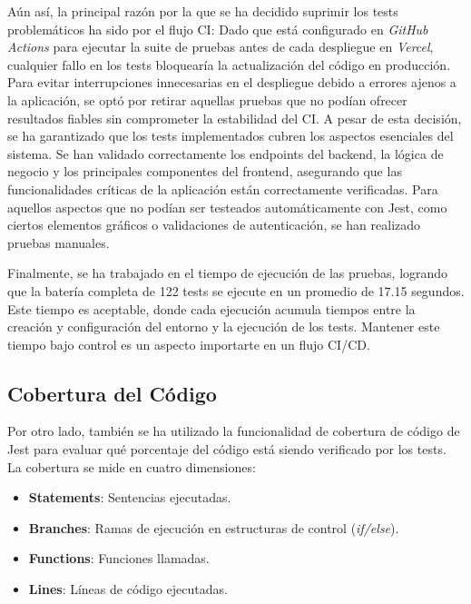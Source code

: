 Aún así, la principal razón por la que se ha decidido suprimir los tests problemáticos ha sido por el flujo CI: Dado que está configurado en \textit{GitHub Actions} para ejecutar la suite de pruebas antes de cada despliegue en \textit{Vercel}, cualquier fallo en los tests bloquearía la actualización del código en producción. Para evitar interrupciones innecesarias en el despliegue debido a errores ajenos a la aplicación, se optó por retirar aquellas pruebas que no podían ofrecer resultados fiables sin comprometer la estabilidad del CI. A pesar de esta decisión, se ha garantizado que los tests implementados cubren los aspectos esenciales del sistema. Se han validado correctamente los endpoints del backend, la lógica de negocio y los principales componentes del frontend, asegurando que las funcionalidades críticas de la aplicación están correctamente verificadas. Para aquellos aspectos que no podían ser testeados automáticamente con Jest, como ciertos elementos gráficos o validaciones de autenticación, se han realizado pruebas manuales.

Finalmente, se ha trabajado en el tiempo de ejecución de las pruebas, logrando que la batería completa de 122 tests se ejecute en un promedio de 17.15 segundos. Este tiempo es aceptable, donde cada ejecución acumula tiempos entre la creación y configuración del entorno y la ejecución de los tests. Mantener este tiempo bajo control es un aspecto importarte en un flujo CI/CD.

\subsection{Cobertura del Código}

Por otro lado, también se ha utilizado la funcionalidad de cobertura de código de Jest para evaluar qué porcentaje del código está siendo verificado por los tests. La cobertura se mide en cuatro dimensiones:

\begin{itemize}
    \item \textbf{Statements}: Sentencias ejecutadas. \vspace{-5pt}
    \item \textbf{Branches}: Ramas de ejecución en estructuras de control (\textit{if/else}). \vspace{-5pt}
    \item \textbf{Functions}: Funciones llamadas. \vspace{-5pt}
    \item \textbf{Lines}: Líneas de código ejecutadas.
\end{itemize}

